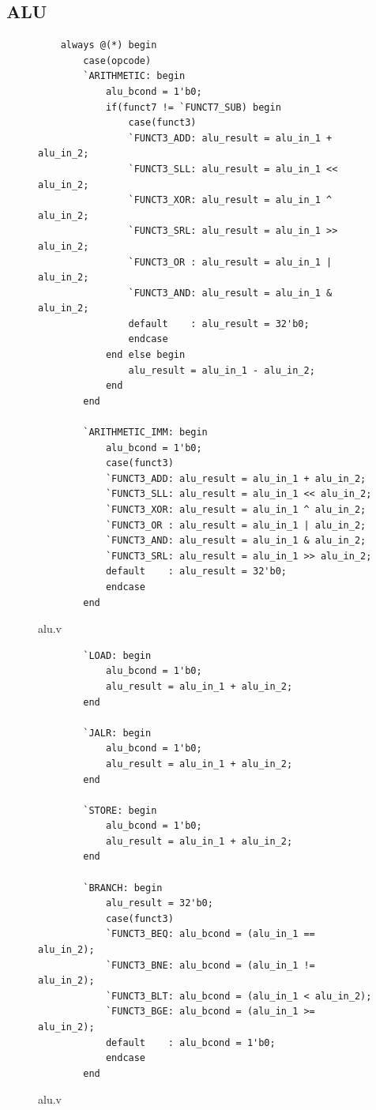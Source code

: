 \documentclass[openright, a4paper]{article}
\begin{document}
\subsection{ALU}
\begin{figure}[!h]
    \begin{verbatim}
    always @(*) begin
        case(opcode)
        `ARITHMETIC: begin
            alu_bcond = 1'b0;
            if(funct7 != `FUNCT7_SUB) begin
                case(funct3)
                `FUNCT3_ADD: alu_result = alu_in_1 + alu_in_2;
                `FUNCT3_SLL: alu_result = alu_in_1 << alu_in_2;
                `FUNCT3_XOR: alu_result = alu_in_1 ^ alu_in_2;
                `FUNCT3_SRL: alu_result = alu_in_1 >> alu_in_2;
                `FUNCT3_OR : alu_result = alu_in_1 | alu_in_2;
                `FUNCT3_AND: alu_result = alu_in_1 & alu_in_2;
                default    : alu_result = 32'b0;
                endcase
            end else begin
                alu_result = alu_in_1 - alu_in_2;
            end
        end

        `ARITHMETIC_IMM: begin
            alu_bcond = 1'b0;
            case(funct3)
            `FUNCT3_ADD: alu_result = alu_in_1 + alu_in_2;
            `FUNCT3_SLL: alu_result = alu_in_1 << alu_in_2;
            `FUNCT3_XOR: alu_result = alu_in_1 ^ alu_in_2;
            `FUNCT3_OR : alu_result = alu_in_1 | alu_in_2;
            `FUNCT3_AND: alu_result = alu_in_1 & alu_in_2;
            `FUNCT3_SRL: alu_result = alu_in_1 >> alu_in_2;
            default    : alu_result = 32'b0;
            endcase
        end
    \end{verbatim}
    \caption{alu.v}
\end{figure}
\begin{figure}[!h]
    \begin{verbatim}
        `LOAD: begin
            alu_bcond = 1'b0;
            alu_result = alu_in_1 + alu_in_2;
        end

        `JALR: begin
            alu_bcond = 1'b0;
            alu_result = alu_in_1 + alu_in_2;
        end

        `STORE: begin
            alu_bcond = 1'b0;
            alu_result = alu_in_1 + alu_in_2;
        end

        `BRANCH: begin
            alu_result = 32'b0;
            case(funct3)
            `FUNCT3_BEQ: alu_bcond = (alu_in_1 == alu_in_2);
            `FUNCT3_BNE: alu_bcond = (alu_in_1 != alu_in_2);
            `FUNCT3_BLT: alu_bcond = (alu_in_1 < alu_in_2);
            `FUNCT3_BGE: alu_bcond = (alu_in_1 >= alu_in_2);
            default    : alu_bcond = 1'b0; 
            endcase
        end
    \end{verbatim}
    \caption{alu.v}
\end{figure}
\end{document}
